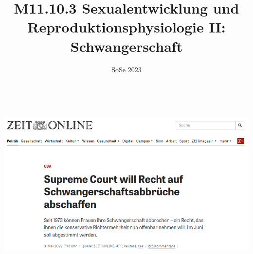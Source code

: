 \documentclass{beamer}
\title[M11.10.3 Schwangerschaft]{M11.10.3 Sexualentwicklung und Reproduktionsphysiologie II: Schwangerschaft}
\author[melanie.stefan@medicalschool-berlin.de]{}
\institute[]{Prof. Melanie Stefan - melanie.stefan@medicalschool-berlin.de}
\date{SoSe 2023}
\begin{document}
{
\begin{frame}

 \maketitle 

$\,$\\[6cm]


\end{frame} 
}




\begin{frame}

\begin{center}
\includegraphics[width=\textwidth]{supreme_court_abtreibung.png}
\end{center}

\end{frame} 



\end{document}
